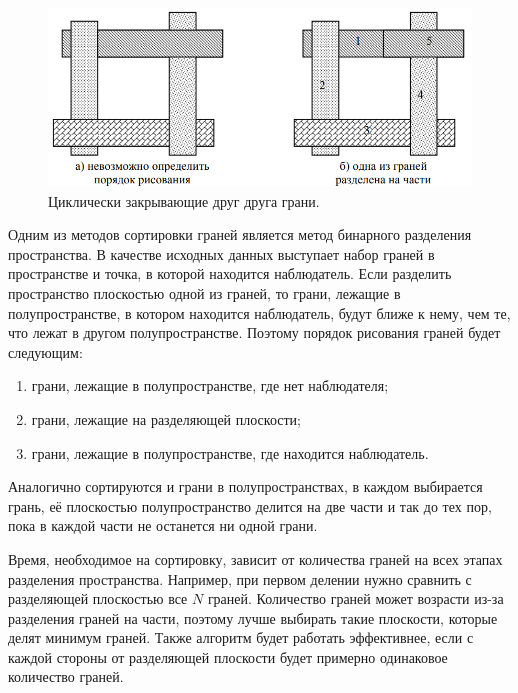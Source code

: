 \begin{figure}[H]
    \centering
    \includegraphics[width=\textwidth]{img/artist_algorithm_2.png}
    \caption{Циклически закрывающие друг друга грани.}
    \label{fig:artist_algorithm_2}
\end{figure}

Одним из методов сортировки граней является метод бинарного разделения пространства. В качестве исходных данных выступает набор граней в пространстве и точка, в которой находится наблюдатель. Если разделить пространство плоскостью одной из граней, то грани, лежащие в полупространстве, в котором находится наблюдатель, будут ближе к нему, чем те, что лежат в другом полупространстве. Поэтому порядок рисования граней будет следующим:

\begin{enumerate}
\item грани, лежащие в полупространстве, где нет наблюдателя;
\item грани, лежащие на разделяющей плоскости;
\item грани, лежащие в полупространстве, где находится наблюдатель.
\end{enumerate}

Аналогично сортируются и грани в полупространствах, в каждом выбирается грань, её плоскостью полупространство делится на две части и так до тех пор, пока в каждой части не останется ни одной грани.

Время, необходимое на сортировку, зависит от количества граней на всех этапах разделения пространства. Например, при первом делении нужно сравнить с разделяющей плоскостью все $N$ граней. Количество граней может возрасти из-за разделения граней на части, поэтому лучше выбирать такие плоскости, которые делят минимум граней. Также алгоритм будет работать эффективнее, если с каждой стороны от разделяющей плоскости будет примерно одинаковое количество граней.

